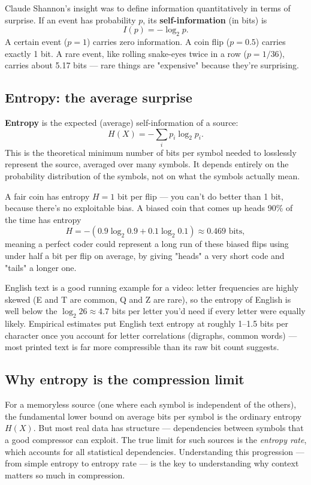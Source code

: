 \documentclass[11pt]{article}
\begin{document}
Claude Shannon's insight was to define information quantitatively in terms of surprise. If an event has probability $p$, its \textbf{self-information} (in bits) is
\[
I(p) = -\log_2 p .
\]
A certain event ($p=1$) carries zero information. A coin flip ($p=0.5$) carries exactly 1 bit. A rare event, like rolling snake-eyes twice in a row ($p = 1/36$), carries about 5.17 bits — rare things are "expensive" because they're surprising.

\subsection{Entropy: the average surprise}

\textbf{Entropy} is the expected (average) self-information of a source:
\[
H(X) = -\sum_{i} p_i \log_2 p_i .
\]
This is the theoretical minimum number of bits per symbol needed to losslessly represent the source, averaged over many symbols. It depends entirely on the probability distribution of the symbols, not on what the symbols actually mean.

A fair coin has entropy $H = 1$ bit per flip — you can't do better than 1 bit, because there's no exploitable bias. A biased coin that comes up heads 90\% of the time has entropy
\[
H = -(0.9\log_2 0.9 + 0.1 \log_2 0.1) \approx 0.469 \text{ bits},
\]
meaning a perfect coder could represent a long run of these biased flips using under half a bit per flip on average, by giving "heads" a very short code and "tails" a longer one.

English text is a good running example for a video: letter frequencies are highly skewed (E and T are common, Q and Z are rare), so the entropy of English is well below the $\log_2 26 \approx 4.7$ bits per letter you'd need if every letter were equally likely. Empirical estimates put English text entropy at roughly 1--1.5 bits per character once you account for letter correlations (digraphs, common words) — most printed text is far more compressible than its raw bit count suggests.

\subsection{Why entropy is the compression limit}

For a memoryless source (one where each symbol is independent of the others), the fundamental lower bound on average bits per symbol is the ordinary entropy $H(X)$. But most real data has structure — dependencies between symbols that a good compressor can exploit. The true limit for such sources is the \emph{entropy rate}, which accounts for all statistical dependencies. Understanding this progression — from simple entropy to entropy rate — is the key to understanding why context matters so much in compression.
\end{document}
